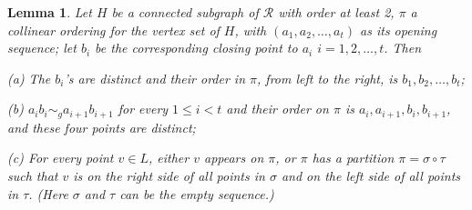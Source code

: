 \documentclass[12pt]{article}
\newtheorem{lem}{Lemma}
\begin{document}
\begin{lem}\label{lem.insertion_order}
Let $H$ be a connected subgraph of $\mathcal{R}$ with order at least 2,
$\pi$ a collinear ordering for the vertex set of $H$,
with $(a_1, a_2, \dots, a_t)$ as its opening sequence;
let $b_i$ be the corresponding closing point to $a_i$ $i = 1, 2, \dots, t$.
Then

(a) The $b_i$'s are distinct and their order in $\pi$, from left to the right, is $b_1, b_2, \dots, b_t$;

(b) $a_i b_i \sim_g a_{i+1}b_{i+1}$ for every $1 \le i < t$ and their order on $\pi$ is $a_i, a_{i+1}, b_i, b_{i+1}$,
and these four points are distinct;

(c) For every point $v \in L$, either $v$ appears on $\pi$, 
or $\pi$ has a partition $\pi = \sigma \circ \tau$ such that $v$
is on the right side of all points in $\sigma$ and on the left side of all
points in $\tau$. (Here $\sigma$ and $\tau$ can be the empty sequence.)
\end{lem}
\end{document}
